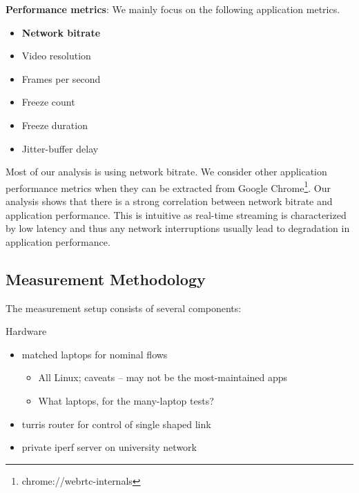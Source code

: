 \textbf{Performance metrics}: We mainly focus on the following application metrics. 
\begin{itemize}
    \item \textbf{Network bitrate}
    \item Video resolution
    \item Frames per second
    \item Freeze count
    \item Freeze duration
    \item Jitter-buffer delay 
\end{itemize}

Most of our analysis is using network bitrate. We consider other application performance metrics when they can be extracted from Google Chrome\footnote{chrome://webrtc-internals}. Our analysis shows that there is a strong correlation between network bitrate and application performance. This is intuitive as real-time streaming is characterized by low latency and thus any network interruptions usually lead to degradation in application performance. 

\subsection{Measurement Methodology}
  
The measurement setup consists of several components:

Hardware
\begin{itemize}
    \item matched laptops for nominal flows
          \begin{itemize}
              \item All Linux; caveats -- may not be the most-maintained apps
              \item What laptops, for the many-laptop tests?
          \end{itemize}
    \item turris router for control of single shaped link
    \item private iperf server on university network
\end{itemize}

